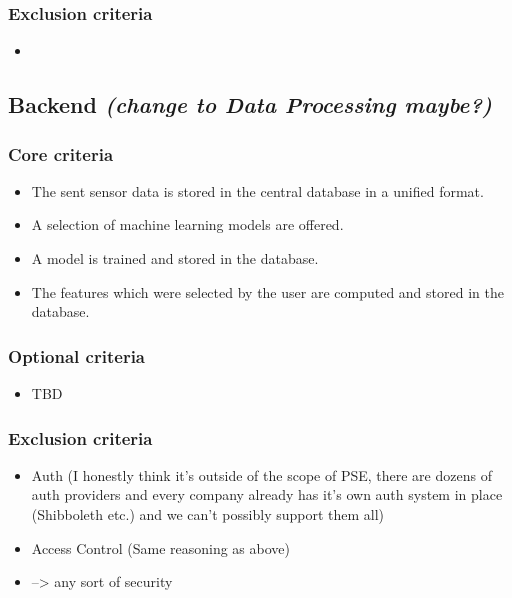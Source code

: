 \subsubsection{Exclusion criteria}
\begin{itemize}
    \item 
\end{itemize}


\subsection{Backend \emph{(change to Data Processing maybe?)}}
\subsubsection{Core criteria}
\begin{itemize}
    \item The sent sensor data is stored in the central database in a unified format.
    \item A selection of machine learning models are offered.
    \item A model is trained and stored in the database.
    \item The features which were selected by the user are computed and stored in the database.
\end{itemize}

\subsubsection{Optional criteria}
\begin{itemize}
    \item TBD
\end{itemize}

\subsubsection{Exclusion criteria}
\begin{itemize}
    \item Auth (I honestly think it's outside of the scope of PSE, there are dozens of auth providers and every company already has it's own auth system in place (Shibboleth etc.) and we can't possibly support them all)
    \item Access Control (Same reasoning as above)
    \item --> any sort of security
\end{itemize}
